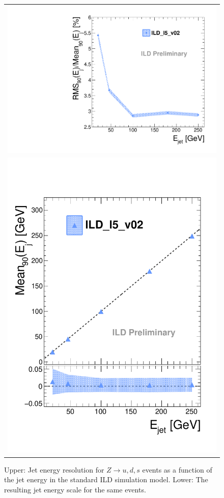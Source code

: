 \begin{figure}
  \begin{tabular}[c]{c}
    \includegraphics[width=0.85\hsize]{chapters/figures/JER_IDR_Large.pdf} \\
    \includegraphics[width=0.85\hsize]{chapters/figures/JES_IDR_Large.pdf}
  \end{tabular}
  \caption{Upper: Jet energy resolution for $Z\rightarrow u,d,s$ events as a function of the jet energy in the standard ILD simulation model.
    Lower: The resulting jet energy scale for the same events.}
\label{fig:ild_jer_jes}
\end{figure}


